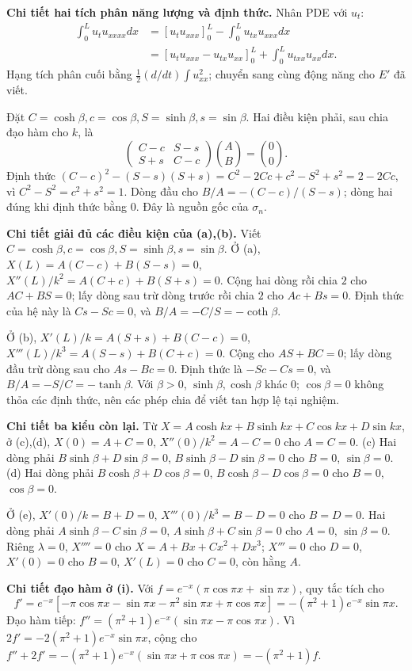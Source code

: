 \textbf{Chi tiết hai tích phân năng lượng và định thức.} Nhân PDE với $u_t$:
\[\begin{aligned}
\int_0^Lu_tu_{xxxx}dx
&=[u_tu_{xxx}]_0^L-\int_0^Lu_{tx}u_{xxx}dx\\
&=[u_tu_{xxx}-u_{tx}u_{xx}]_0^L+\int_0^Lu_{txx}u_{xx}dx.
\end{aligned}\]
Hạng tích phân cuối bằng $\frac12(d/dt)\int u_{xx}^2$; chuyển sang cùng động năng cho $E'$ đã viết.

Đặt $C=\cosh\beta,c=\cos\beta,S=\sinh\beta,s=\sin\beta$. Hai điều kiện phải, sau chia đạo hàm cho $k$, là
\[\begin{pmatrix}C-c&S-s\\S+s&C-c\end{pmatrix}\binom AB=\binom00.\]
Định thức $(C-c)^2-(S-s)(S+s)=C^2-2Cc+c^2-S^2+s^2=2-2Cc$, vì $C^2-S^2=c^2+s^2=1$. Dòng đầu cho $B/A=-(C-c)/(S-s)$; dòng hai đúng khi định thức bằng $0$. Đây là nguồn gốc của $\sigma_n$.

\textbf{Chi tiết giải đủ các điều kiện của (a),(b).} Viết $C=\cosh\beta,c=\cos\beta,S=\sinh\beta,s=\sin\beta$.
Ở (a), $X(L)=A(C-c)+B(S-s)=0$, $X''(L)/k^2=A(C+c)+B(S+s)=0$. Cộng hai dòng rồi chia $2$ cho $AC+BS=0$; lấy dòng sau trừ dòng trước rồi chia $2$ cho $Ac+Bs=0$. Định thức của hệ này là $Cs-Sc=0$, và $B/A=-C/S=-\coth\beta$.

Ở (b), $X'(L)/k=A(S+s)+B(C-c)=0$, $X'''(L)/k^3=A(S-s)+B(C+c)=0$. Cộng cho $AS+BC=0$; lấy dòng đầu trừ dòng sau cho $As-Bc=0$. Định thức là $-Sc-Cs=0$, và $B/A=-S/C=-\tanh\beta$. Với $\beta>0$, $\sinh\beta,\cosh\beta$ khác $0$; $\cos\beta=0$ không thỏa các định thức, nên các phép chia để viết tan hợp lệ tại nghiệm.

\textbf{Chi tiết ba kiểu còn lại.} Từ $X=A\cosh kx+B\sinh kx+C\cos kx+D\sin kx$, ở (c),(d), $X(0)=A+C=0$, $X''(0)/k^2=A-C=0$ cho $A=C=0$. (c) Hai dòng phải $B\sinh\beta+D\sin\beta=0$, $B\sinh\beta-D\sin\beta=0$ cho $B=0$, $\sin\beta=0$. (d) Hai dòng phải $B\cosh\beta+D\cos\beta=0$, $B\cosh\beta-D\cos\beta=0$ cho $B=0$, $\cos\beta=0$.

Ở (e), $X'(0)/k=B+D=0$, $X'''(0)/k^3=B-D=0$ cho $B=D=0$. Hai dòng phải $A\sinh\beta-C\sin\beta=0$, $A\sinh\beta+C\sin\beta=0$ cho $A=0$, $\sin\beta=0$. Riêng $\lambda=0$, $X''''=0$ cho $X=A+Bx+Cx^2+Dx^3$; $X'''=0$ cho $D=0$, $X'(0)=0$ cho $B=0$, $X'(L)=0$ cho $C=0$, còn hằng $A$.

\textbf{Chi tiết đạo hàm ở (i).} Với $f=e^{-x}(\pi\cos\pi x+\sin\pi x)$, quy tắc tích cho
\[f'=e^{-x}[-\pi\cos\pi x-\sin\pi x-\pi^2\sin\pi x+\pi\cos\pi x]
=-(\pi^2+1)e^{-x}\sin\pi x.\]
Đạo hàm tiếp: $f''=(\pi^2+1)e^{-x}(\sin\pi x-\pi\cos\pi x)$. Vì $2f'=-2(\pi^2+1)e^{-x}\sin\pi x$, cộng cho $f''+2f'=-(\pi^2+1)e^{-x}(\sin\pi x+\pi\cos\pi x)=-(\pi^2+1)f$.

